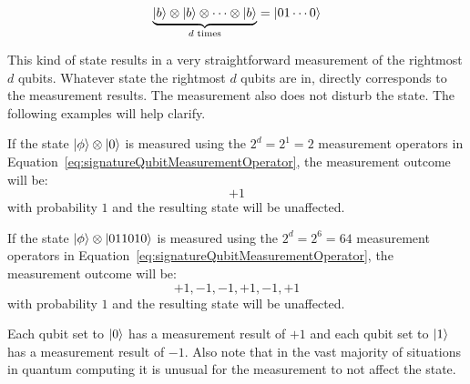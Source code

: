 \begin{align}
\underbrace{\ket{b} \otimes \ket{b} \otimes \cdots \otimes \ket{b}}_{d \text{ times}} = \ket{01 \cdots 0}
\end{align}

This kind of state results in a very straightforward measurement of the rightmost $d$ qubits. Whatever state the rightmost $d$ qubits are in, directly corresponds to the measurement results. The measurement also does not disturb the state.  The following examples will help clarify.
\begin{example}
If the state $\ket{\phi} \otimes \ket{0}$ is measured using the $2^d = 2^1 = 2$ measurement operators in Equation~\eqref{eq:signatureQubitMeasurementOperator}, the measurement outcome will be:
$$+1$$
with probability $1$ and the resulting state will be unaffected.
\end{example}
\begin{example}
If the state $\ket{\phi} \otimes \ket{011010}$ is measured using the $2^d = 2^6 = 64$ measurement operators in Equation~\eqref{eq:signatureQubitMeasurementOperator}, the measurement outcome will be:
$$+1,-1,-1,+1,-1,+1$$
with probability $1$ and the resulting state will be unaffected.
\end{example}
Each qubit set to $\ket{0}$ has a measurement result of $+1$ and each qubit set to $\ket{1}$ has a measurement result of $-1$. Also note that in the vast majority of situations in quantum computing it is unusual for the measurement to not affect the state.


